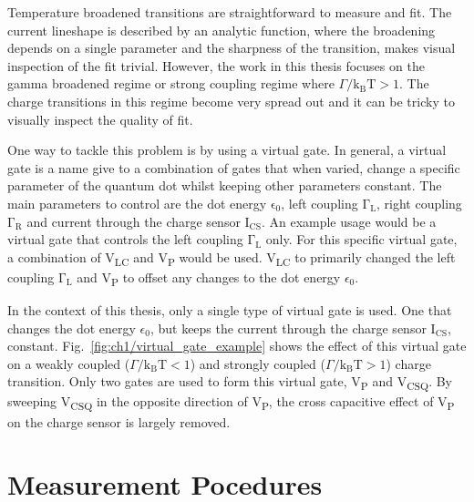 Temperature broadened transitions are straightforward to measure and fit. The current lineshape is described by an analytic function, where the broadening depends on a single parameter and the sharpness of the transition, makes visual inspection of the fit trivial. However, the work in this thesis focuses on the gamma broadened regime or strong coupling regime where $\Gamma/\mathrm{k_BT}>1$. The charge transitions in this regime become very spread out and it can be tricky to visually inspect the quality of fit. 

One way to tackle this problem is by using a virtual gate. In general, a virtual gate is a name give to a combination of gates that when varied, change a specific parameter of the quantum dot whilst keeping other parameters constant. The main parameters to control are the dot energy $\mathrm{\epsilon_0}$, left coupling $\mathrm{\Gamma_L}$, right coupling $\mathrm{\Gamma_R}$ and current through the charge sensor $\mathrm{I_{CS}}$. An example usage would be a virtual gate that controls the left coupling $\mathrm{\Gamma_L}$ only. For this specific virtual gate, a combination of V\textsubscript{LC} and V\textsubscript{P} would be used. V\textsubscript{LC} to primarily changed the left coupling $\mathrm{\Gamma_L}$ and V\textsubscript{P} to offset any changes to the dot energy $\epsilon_0$. 


In the context of this thesis, only a single type of virtual gate is used. One that changes the dot energy $\epsilon_0$, but keeps the current through the charge sensor $\mathrm{I_{CS}}$, constant. Fig.~\ref{fig:ch1/virtual_gate_example} shows the effect of this virtual gate on a weakly coupled ($\Gamma/\mathrm{k_BT}<1$) and strongly coupled ($\Gamma/\mathrm{k_BT}>1$) charge transition. Only two gates are used to form this virtual gate, V\textsubscript{P} and V\textsubscript{CSQ}. By sweeping V\textsubscript{CSQ} in the opposite direction of V\textsubscript{P}, the cross capacitive effect of V\textsubscript{P} on the charge sensor is largely removed. 


\afterpage{\clearpage}
\section{Measurement Pocedures}

